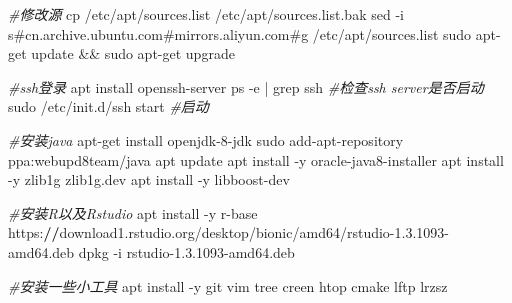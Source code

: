 \documentclass[
  10pt,
]{book}
\newenvironment{Shaded}{\begin{snugshade}}{\end{snugshade}}
\newcommand{\CommentTok}[1]{\textcolor[rgb]{0.56,0.35,0.01}{\textit{#1}}}
\newcommand{\DecValTok}[1]{\textcolor[rgb]{0.00,0.00,0.81}{#1}}
\newcommand{\ErrorTok}[1]{\textcolor[rgb]{0.64,0.00,0.00}{\textbf{#1}}}
\newcommand{\FloatTok}[1]{\textcolor[rgb]{0.00,0.00,0.81}{#1}}
\newcommand{\NormalTok}[1]{#1}
\newcommand{\SpecialCharTok}[1]{\textcolor[rgb]{0.00,0.00,0.00}{#1}}
\newcommand{\StringTok}[1]{\textcolor[rgb]{0.31,0.60,0.02}{#1}}
\begin{document}
\begin{Shaded}
\begin{Highlighting}[]
\CommentTok{\#修改源}
\NormalTok{cp }\SpecialCharTok{/}\NormalTok{etc}\SpecialCharTok{/}\NormalTok{apt}\SpecialCharTok{/}\NormalTok{sources.list }\SpecialCharTok{/}\NormalTok{etc}\SpecialCharTok{/}\NormalTok{apt}\SpecialCharTok{/}\NormalTok{sources.list.bak}
\NormalTok{sed }\SpecialCharTok{{-}}\NormalTok{i }\StringTok{\textquotesingle{}s\#cn.archive.ubuntu.com\#mirrors.aliyun.com\#g\textquotesingle{}} \SpecialCharTok{/}\NormalTok{etc}\SpecialCharTok{/}\NormalTok{apt}\SpecialCharTok{/}\NormalTok{sources.list}
\NormalTok{sudo apt}\SpecialCharTok{{-}}\NormalTok{get update }\SpecialCharTok{\&\&}\NormalTok{ sudo apt}\SpecialCharTok{{-}}\NormalTok{get upgrade}

\CommentTok{\#ssh登录}
\NormalTok{apt install openssh}\SpecialCharTok{{-}}\NormalTok{server}
\NormalTok{ps }\SpecialCharTok{{-}}\NormalTok{e }\SpecialCharTok{|}\NormalTok{  grep ssh   }\CommentTok{\#检查ssh server是否启动}
\NormalTok{sudo }\SpecialCharTok{/}\NormalTok{etc}\SpecialCharTok{/}\NormalTok{init.d}\SpecialCharTok{/}\NormalTok{ssh start  }\CommentTok{\#启动}

\CommentTok{\#安装java}
\NormalTok{apt}\SpecialCharTok{{-}}\NormalTok{get install openjdk}\DecValTok{{-}8}\SpecialCharTok{{-}}\NormalTok{jdk}
\NormalTok{sudo add}\SpecialCharTok{{-}}\NormalTok{apt}\SpecialCharTok{{-}}\NormalTok{repository ppa}\SpecialCharTok{:}\NormalTok{webupd8team}\SpecialCharTok{/}\NormalTok{java}
\NormalTok{apt update}
\NormalTok{apt install }\SpecialCharTok{{-}}\NormalTok{y oracle}\SpecialCharTok{{-}}\NormalTok{java8}\SpecialCharTok{{-}}\NormalTok{installer}
\NormalTok{apt install }\SpecialCharTok{{-}}\NormalTok{y zlib1g zlib1g.dev}
\NormalTok{apt install }\SpecialCharTok{{-}}\NormalTok{y libboost}\SpecialCharTok{{-}}\NormalTok{dev}

\CommentTok{\#安装R以及Rstudio}
\NormalTok{apt install }\SpecialCharTok{{-}}\NormalTok{y r}\SpecialCharTok{{-}}\NormalTok{base}
\NormalTok{https}\SpecialCharTok{:}\ErrorTok{//}\NormalTok{download1.rstudio.org}\SpecialCharTok{/}\NormalTok{desktop}\SpecialCharTok{/}\NormalTok{bionic}\SpecialCharTok{/}\NormalTok{amd64}\SpecialCharTok{/}\NormalTok{rstudio}\DecValTok{{-}1}\NormalTok{.}\FloatTok{3.1093}\SpecialCharTok{{-}}\NormalTok{amd64.deb}
\NormalTok{dpkg }\SpecialCharTok{{-}}\NormalTok{i rstudio}\DecValTok{{-}1}\NormalTok{.}\FloatTok{3.1093}\SpecialCharTok{{-}}\NormalTok{amd64.deb}

\CommentTok{\#安装一些小工具}
\NormalTok{apt install }\SpecialCharTok{{-}}\NormalTok{y git vim tree creen htop cmake lftp lrzsz}


\end{Highlighting}
\end{Shaded}
\end{document}
